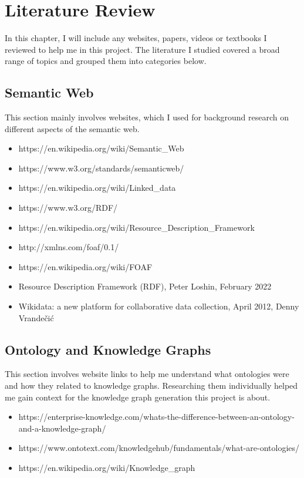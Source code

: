 \chapter{Literature Review}
In this chapter, I will include any websites, papers, videos or textbooks I reviewed to help me in this project. The literature I studied covered a broad range of topics and grouped them into categories below. 

\section{Semantic Web}
\hspace{0.5cm} This section mainly involves websites, which I used for background research on different aspects of the semantic web.

\begin{itemize}
\item https://en.wikipedia.org/wiki/Semantic\_Web 
\item https://www.w3.org/standards/semanticweb/ 
\item https://en.wikipedia.org/wiki/Linked\_data
\item https://www.w3.org/RDF/
\item https://en.wikipedia.org/wiki/Resource\_Description\_Framework
\item http://xmlns.com/foaf/0.1/
\item https://en.wikipedia.org/wiki/FOAF
\item Resource Description Framework (RDF), Peter Loshin, February 2022
\item Wikidata: a new platform for collaborative data collection, April 2012, Denny Vrandečić
\end{itemize}


\section{Ontology and Knowledge Graphs}
\hspace{0.5cm} This section involves website links to help me understand what ontologies were and how they related to knowledge graphs. Researching them individually helped me gain context for the knowledge graph generation this project is about. 

\begin{itemize}
\item https://enterprise-knowledge.com/whats-the-difference-between-an-ontology-and-a-knowledge-graph/ 
\item https://www.ontotext.com/knowledgehub/fundamentals/what-are-ontologies/
\item https://en.wikipedia.org/wiki/Knowledge\_graph 
\end{itemize}


